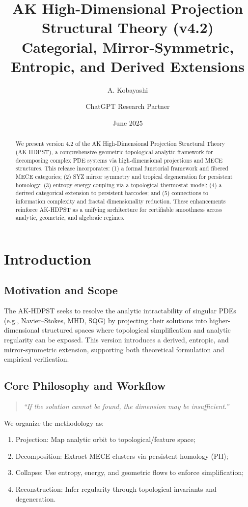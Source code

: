 \documentclass[11pt]{article}
\title{AK High-Dimensional Projection Structural Theory (v4.2)\\Categorial, Mirror-Symmetric, Entropic, and Derived Extensions}
\author{A. Kobayashi \and ChatGPT Research Partner}
\date{June 2025}
\theoremstyle{remark}
\begin{document}
\maketitle

\begin{abstract}
We present version 4.2 of the AK High-Dimensional Projection Structural Theory (AK-HDPST), a comprehensive geometric-topological-analytic framework for decomposing complex PDE systems via high-dimensional projections and MECE structures. This release incorporates: (1) a formal functorial framework and fibered MECE categories; (2) SYZ mirror symmetry and tropical degeneration for persistent homology; (3) entropy-energy coupling via a topological thermostat model; (4) a derived categorical extension to persistent barcodes; and (5) connections to information complexity and fractal dimensionality reduction. These enhancements reinforce AK-HDPST as a unifying architecture for certifiable smoothness across analytic, geometric, and algebraic regimes.
\end{abstract}

\tableofcontents

\section{Introduction}

\subsection{Motivation and Scope}
The AK-HDPST seeks to resolve the analytic intractability of singular PDEs (e.g., Navier--Stokes, MHD, SQG) by projecting their solutions into higher-dimensional structured spaces where topological simplification and analytic regularity can be exposed. This version introduces a derived, entropic, and mirror-symmetric extension, supporting both theoretical formulation and empirical verification.

\subsection{Core Philosophy and Workflow}
\begin{quote}
\textit{“If the solution cannot be found, the dimension may be insufficient.”}
\end{quote}
We organize the methodology as:
\begin{enumerate}
    \item Projection: Map analytic orbit to topological/feature space;
    \item Decomposition: Extract MECE clusters via persistent homology (PH);
    \item Collapse: Use entropy, energy, and geometric flows to enforce simplification;
    \item Reconstruction: Infer regularity through topological invariants and degeneration.
\end{enumerate}
\end{document}
